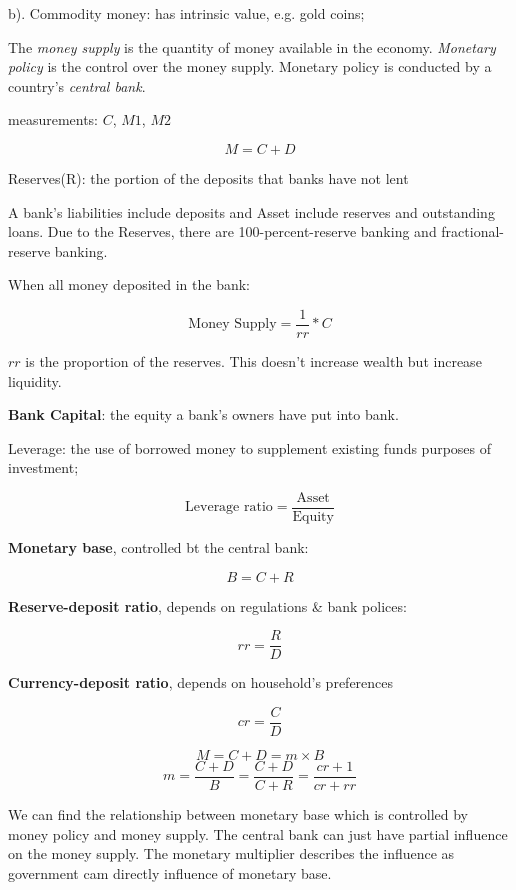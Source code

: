 \documentclass[10pt, a4paper]{article}
\begin{document}
                b). Commodity money: has intrinsic value, e.g. gold coins; 

                The \emph{money supply} is the quantity of money available in the economy. \emph{Monetary policy} is the control over the money supply. Monetary policy is conducted by a country's \emph{central bank}. 

                measurements: $C$, $M1$, $M2$

                $$M = C + D$$

                Reserves(R): the portion of the deposits that banks have not lent

                A bank's liabilities include deposits and Asset include reserves and outstanding loans. Due to the Reserves, there are 100-percent-reserve banking and fractional-reserve banking. 
                
                When all money deposited in the bank: 
                
                $$\text{Money Supply} = \frac{1}{rr} * C$$

                $rr$ is the proportion of the reserves. This doesn't increase wealth but increase liquidity.

                \textbf{Bank Capital}: the equity a bank's owners have put into bank. 

                Leverage: the use of borrowed money to supplement existing funds purposes of investment; 

                $$\text{Leverage ratio} = \frac{\text{Asset}}{\text{Equity}}$$

                \textbf{Monetary base}, controlled bt the central bank: 

                $$B = C + R$$

                \textbf{Reserve-deposit ratio}, depends on regulations \& bank polices:
            
                $$rr = \frac{R}{D}$$

                \textbf{Currency-deposit ratio}, depends on household's preferences 

                $$cr = \frac{C}{D}$$

                $$M = C + D = m \times B$$
                $$m = \frac{C + D}{B} = \frac{C + D}{C + R} = \frac{cr + 1}{cr + rr}$$

                We can find the relationship between monetary base which is controlled by money policy and money supply. The central bank can just have partial influence on the money supply. The monetary multiplier describes the influence as government cam directly influence of monetary base. 
\end{document}
